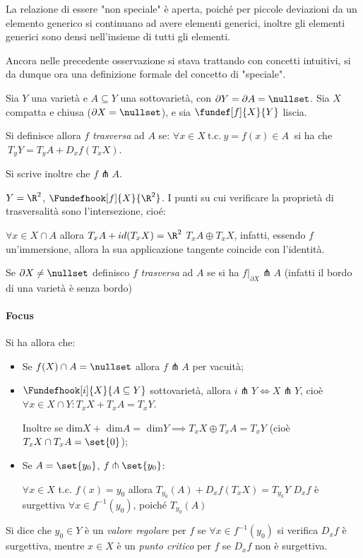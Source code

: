 \begin{oss}
La relazione di essere "non speciale" è aperta, poiché per piccole deviazioni da un elemento generico si continuano ad avere elementi generici, inoltre gli elementi generici sono densi nell'insieme di tutti gli elementi.
\end{oss}

Ancora nelle precedente osservazione si stava trattando con concetti intuitivi, si da dunque ora una definizione formale del concetto di "speciale".

\begin{defn}[Trasversalità]
Sia $Y$ una varietà e $A\subseteq Y$ una sottovarietà, con $\partial Y = \partial A = \nullset$. Sia $X$ compatta e chiusa ($\partial X = \nullset$), e sia $\fundef[f]{X}{Y}$ liscia.

Si definisce allora $f$ \emph{trasversa} ad $A$ se: $\forall x \in X~$t.c.$~y = f(x) \in A~$ si ha che $~T_yY = T_yA + D_xf(T_xX)$.

Si scrive inoltre che $f \pitchfork A$.
\end{defn}

\begin{es}
$Y = \R^2$, $\Fundefhook[f]{X}{\R^2}$. I punti su cui verificare la proprietà di trasversalità sono l'intersezione, cioé:

$\forall x \in X \cap A$ allora $T_xA + id(T_xX) = \R^2$ \iff $T_xA \oplus T_xX$, infatti, essendo $f$ un'immersione, allora la sua applicazione tangente coincide con l'identità.
\end{es}

\begin{defn}
Se $\partial X \neq \nullset$ definisco $f$ \emph{trasversa} ad $A$ se si ha $f|_{\partial X} \pitchfork A$ (infatti il bordo di una varietà è senza bordo)
\end{defn}

\paragraph{Focus}
Si ha allora che:
\begin{itemize}
\item Se $f(X) \cap A = \nullset$ allora $f \pitchfork A$ per vacuità;
\item $\Fundefhook[i]{X}{A \subseteq Y}$ sottovarietà, allora $i \pitchfork Y \iff X \pitchfork Y$, cioè $\forall x \in X\cap Y: T_xX + T_xA = T_xY$.

Inoltre se dim$X +$ dim$A =$ dim$Y \implies T_xX \oplus T_xA = T_xY$ (cioè $T_xX \cap T_xA = \set{0}$);
\item Se $A = \set{y_0}$, $f \pitchfork \set{y_0}$:

$\forall x \in X$ t.c. $f(x) = y_0$ allora $T_{y_0}(A) + D_xf(T_xX) = T_{y_0}Y$ \iff $D_xf$ è surgettiva $\forall x \in f^{-1}(y_0)$, poiché $T_{y_0}(A)$
\end{itemize}

\begin{defn}
Si dice che $y_0 \in Y$ è un \emph{valore regolare} per $f$ se $\forall x \in f^{-1}(y_0)$ si verifica $D_xf$ è surgettiva, mentre $x \in X$ è un \emph{punto critico} per $f$ se $D_xf$ non è surgettiva.
\end{defn}
